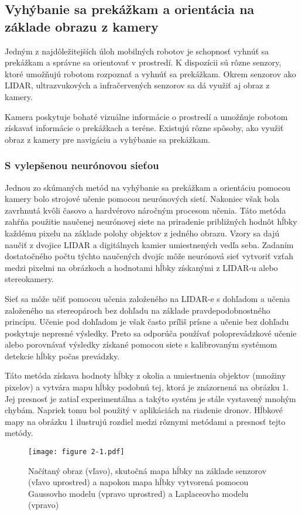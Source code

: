 \subsection{Vyhýbanie sa prekážkam a orientácia na základe obrazu z kamery}
Jedným z najdôležitejších úloh mobilných robotov je schopnosť vyhnúť sa prekážkam a správne sa orientovať v prostredí. K dispozícii sú rôzne senzory, ktoré umožňujú robotom rozpoznať a vyhnúť sa prekážkam. Okrem senzorov ako LIDAR, ultrazvukových a infračervených senzorov sa dá využiť aj obraz z kamery.

Kamera poskytuje bohaté vizuálne informácie o prostredí a umožňuje robotom získavať informácie o prekážkach a teréne. Existujú rôzne spôsoby, ako využiť obraz z kamery pre navigáciu a vyhýbanie sa prekážkam.

\subsubsection{S vylepšenou neurónovou sieťou}
Jednou zo skúmaných metód na vyhýbanie sa prekážkam a orientáciu pomocou kamery bolo strojové učenie pomocou neurónových sietí. Nakoniec však bola zavrhnutá kvôli časovo a hardvérovo náročným procesom učenia. Táto metóda zahŕňa použitie naučenej neurónovej siete na priradenie približných hodnôt hĺbky každému pixelu na základe polohy objektov z jedného obrazu. Vzory sa dajú naučiť z dvojice LIDAR a digitálnych kamier umiestnených vedľa seba. Zadaním dostatočného počtu týchto naučených dvojíc môže neurónová sieť vytvoriť vzťah medzi pixelmi na obrázkoch a hodnotami hĺbky získanými z LIDAR-u alebo stereokamery.

Sieť sa môže učiť pomocou učenia založeného na LIDAR-e s dohľadom a učenia založeného na stereopároch bez dohľadu na základe pravdepodobnostného princípu. Učenie pod dohľadom je však často príliš prísne a učenie bez dohľadu poskytuje nepresné výsledky. Preto sa odporúča používať poloprevádzkové učenie alebo porovnávať výsledky získané pomocou siete s kalibrovaným systémom detekcie hĺbky počas prevádzky.

Táto metóda získava hodnoty hĺbky z okolia a umiestnenia objektov (množiny pixelov) a vytvára mapu hĺbky podobnú tej, ktorá je znázornená na obrázku 1. Jej presnosť je zatiaľ experimentálna a takýto systém je stále vystavený mnohým chybám. Napriek tomu bol použitý v aplikáciách na riadenie dronov. Hĺbkové mapy na obrázku 1 ilustrujú rozdiel medzi rôznymi metódami a presnosť tejto metódy.

\begin{figure}[ht!]
    \centering
    \texttt{[image: figure 2-1.pdf]}
    \caption{Načítaný obraz (vľavo), skutočná mapa hĺbky na základe senzorov (vľavo uprostred) a napokon mapa hĺbky vytvorená pomocou Gaussovho modelu (vpravo uprostred) a Laplaceovho modelu (vpravo)}
    \label{o:2-1}
\end{figure}

